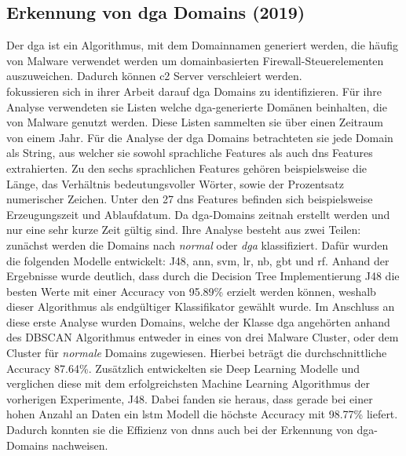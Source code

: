 \documentclass[
    12pt, %
    DIV10,
    ngerman, %
    a4paper, %
    oneside, %
    titlepage, %
    parskip=half, %
    headings=normal, %
    listof=totoc, %
    bibliography=totoc, %
    index=totoc, %
    captions=tableheading, %
    final %
]{scrreprt}
\begin{document}
\subsection{Erkennung von \acs{dga} Domains (2019)}
Der \ac{dga} ist ein Algorithmus, mit dem Domainnamen generiert werden, die häufig von Malware verwendet werden um domainbasierten Firewall-Steuerelementen auszuweichen. Dadurch können \ac{c2} Server verschleiert werden.\\
\textcite{Li2019} fokussieren sich in ihrer Arbeit darauf \ac{dga} Domains zu identifizieren. Für ihre Analyse verwendeten sie Listen \parencite{Bam} welche \ac{dga}-generierte Domänen beinhalten, die von Malware genutzt werden. Diese Listen sammelten sie über einen Zeitraum von einem Jahr. Für die Analyse der \ac{dga} Domains betrachteten sie jede Domain als String, aus welcher sie sowohl sprachliche Features als auch \ac{dns} Features extrahierten. Zu den sechs sprachlichen Features gehören beispielsweise die Länge, das Verhältnis bedeutungsvoller Wörter, sowie der Prozentsatz numerischer Zeichen. Unter den 27 \ac{dns} Features befinden sich beispielsweise Erzeugungszeit und Ablaufdatum. Da \ac{dga}-Domains zeitnah erstellt werden und nur eine sehr kurze Zeit gültig sind. Ihre Analyse besteht aus zwei Teilen: zunächst werden die Domains nach \emph{normal} oder \emph{\ac{dga}} klassifiziert. Dafür wurden die folgenden Modelle entwickelt: J48, \ac{ann}, \ac{svm}, \ac{lr}, \ac{nb}, \ac{gbt} und \ac{rf}. Anhand der Ergebnisse wurde deutlich, dass durch die Decision Tree Implementierung J48 die besten Werte mit einer Accuracy von 95.89\% erzielt werden können, weshalb dieser Algorithmus als endgültiger Klassifikator gewählt wurde.
Im Anschluss an diese erste Analyse wurden Domains, welche der Klasse \ac{dga} angehörten anhand des DBSCAN Algorithmus entweder in eines von drei Malware Cluster, oder dem Cluster für \emph{normale} Domains zugewiesen. Hierbei beträgt die durchschnittliche Accuracy 87.64\%. Zusätzlich entwickelten sie Deep Learning Modelle und verglichen diese mit dem erfolgreichsten Machine Learning Algorithmus der vorherigen Experimente, J48. Dabei fanden sie heraus, dass gerade bei einer hohen Anzahl an Daten ein \ac{lstm} Modell die höchste Accuracy mit 98.77\% liefert. Dadurch konnten sie die Effizienz von \ac{dnns} auch bei der Erkennung von \ac{dga}-Domains nachweisen.
%
\end{document}
